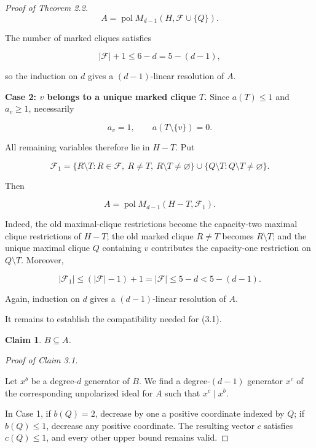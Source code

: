 \documentclass[11pt]{article}
\newtheorem{claim}[theorem]{Claim}
\theoremstyle{definition}
\theoremstyle{remark}
\numberwithin{equation}{section}
\begin{document}
\begin{proof}[Proof of Theorem 2.2]
\nopagebreak[4]
\[
A=\operatorname{pol}M_{d-1}(H,\mathcal F\cup\{Q\}).
\tag{3.3}
\]

The number of marked cliques satisfies

\nopagebreak[4]
\[
|\mathcal F|+1\leq6-d=5-(d-1),
\]

so the induction on $d$ gives a $(d-1)$-linear resolution of $A$.

\textbf{Case 2: $v$ belongs to a unique marked clique $T$.} Since
$a(T)\leq1$ and $a_v\geq1$, necessarily

\nopagebreak[4]
\[
a_v=1,
\qquad
a(T\setminus\{v\})=0.
\]

All remaining variables therefore lie in $H-T$. Put

\nopagebreak[4]
\[
\mathcal F_1
=
\{R\setminus T:R\in\mathcal F,
\ R\neq T,
\ R\setminus T\neq\varnothing\}
\cup
\{Q\setminus T:Q\setminus T\neq\varnothing\}.
\tag{3.4}
\]

Then

\nopagebreak[4]
\[
A=\operatorname{pol}M_{d-1}(H-T,\mathcal F_1).
\tag{3.5}
\]

Indeed, the old maximal-clique restrictions become the capacity-two maximal
clique restrictions of $H-T$; the old marked clique $R\neq T$ becomes
$R\setminus T$; and the unique maximal clique $Q$ containing $v$ contributes
the capacity-one restriction on $Q\setminus T$. Moreover,

\nopagebreak[4]
\[
|\mathcal F_1|
\leq(|\mathcal F|-1)+1
=|\mathcal F|
\leq5-d
<5-(d-1).
\]

Again, induction on $d$ gives a $(d-1)$-linear resolution of $A$.

It remains to establish the compatibility needed for (3.1).

\Needspace{0.25\textheight}
\begin{claim}

$B\subseteq A$.

\end{claim}


\par\medskip\noindent\emph{Proof of Claim 3.1.}\ 

Let $x^b$ be a degree-$d$ generator of $B$. We find a degree-$(d-1)$
generator $x^c$ of the corresponding unpolarized ideal for $A$ such that
$x^c\mid x^b$.

In Case 1, if $b(Q)=2$, decrease by one a positive coordinate indexed by
$Q$; if $b(Q)\leq1$, decrease any positive coordinate. The resulting vector
$c$ satisfies $c(Q)\leq1$, and every other upper bound remains valid.


\end{proof}
\end{document}
